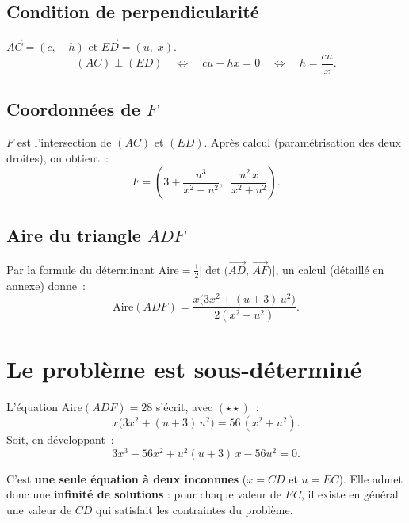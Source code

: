 ﻿\documentclass[a4paper,12pt]{article}
\begin{document}
\subsection*{Condition de perpendicularit\'e}

$\overrightarrow{AC} = (c,\;{-h})$ et $\overrightarrow{ED} = (u,\;x)$.
\[
  (AC)\perp(ED)
  \quad\Longleftrightarrow\quad
  cu - hx = 0
  \quad\Longleftrightarrow\quad
  \boxed{h = \frac{cu}{x}}.  \tag{$\star$}
\]

\subsection*{Coordonn\'ees de $F$}

$F$ est l'intersection de $(AC)$ et $(ED)$.
Apr\`es calcul (param\'etrisation des deux droites),
on obtient~:
\[
  F = \left(3 + \frac{u^3}{x^2+u^2},\;\; \frac{u^2\,x}{x^2+u^2}\right).
\]

\subsection*{Aire du triangle $ADF$}

Par la formule du d\'eterminant
$\text{Aire} = \tfrac{1}{2}\bigl|\det\bigl(\overrightarrow{AD},\,\overrightarrow{AF}\bigr)\bigr|$,
un calcul (d\'etaill\'e en annexe) donne~:
\[
  \boxed{\text{Aire}(ADF) = \frac{x\bigl(3x^2 + (u+3)\,u^2\bigr)}{2(x^2 + u^2)}}.
  \tag{$\star\star$}
\]

\section{Le probl\`eme est sous-d\'etermin\'e}

L'\'equation $\text{Aire}(ADF) = 28$ s'\'ecrit, avec $(\star\star)$~:
\[
  x\bigl(3x^2 + (u+3)\,u^2\bigr) = 56\,(x^2 + u^2).
\]
Soit, en d\'eveloppant~:
\[
  3x^3 - 56x^2 + u^2(u+3)\,x - 56u^2 = 0.   \tag{E}
\]

C'est \textbf{une seule \'equation \`a deux inconnues} ($x = CD$ et $u = EC$).
Elle admet donc une \textbf{infinit\'e de solutions} :
pour chaque valeur de $EC$, il existe en g\'en\'eral une valeur de $CD$
qui satisfait les contraintes du probl\`eme.

\medskip
\end{document}
